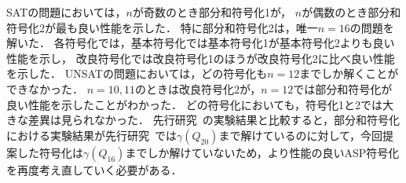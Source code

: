 
SATの問題においては，$n$が奇数のとき部分和符号化1が，
$n$が偶数のとき部分和符号化2が最も良い性能を示した．
特に部分和符号化2は，唯一$n=16$の問題を解いた．
各符号化では，基本符号化では基本符号化1が基本符号化2よりも良い性能を示し，
改良符号化では改良符号化1のほうが改良符号化2に比べ良い性能を示した．
%
UNSATの問題においては，どの符号化も$n=12$までしか解くことができなかった．
$n=10,11$のときは改良符号化2が，$n=12$では部分和符号化が良い性能を示したことがわかった．
どの符号化においても，符号化1と2では大きな差異は見られなかった．
%
先行研究~\cite{yamamoto21}の実験結果と比較すると，部分和符号化における実験結果が先行研究~\cite{yamamoto21}では$\gamma(Q_{20})$まで解けているのに対して，今回提案した符号化は$\gamma(Q_{16})$までしか解けていないため，より性能の良いASP符号化を再度考え直していく必要がある．

